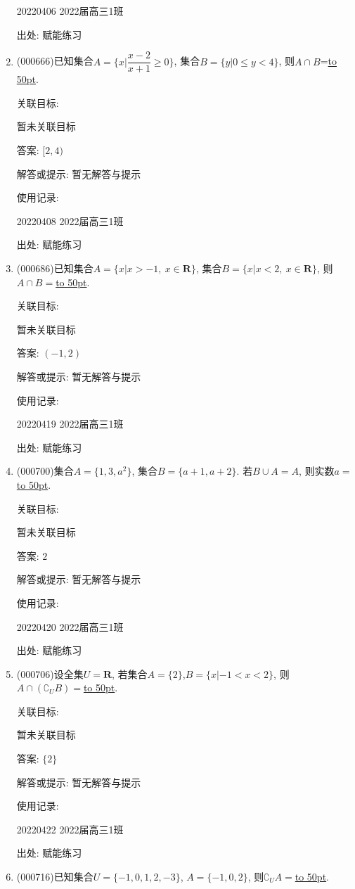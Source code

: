 \documentclass[10pt,a4paper]{article}
\newcommand{\blank}[1]{\underline{\hbox to #1pt{}}}
\begin{document}
\begin{enumerate}[1.]
20220406	2022届高三1班	


出处: 赋能练习
\item { (000666)}已知集合$A=\{x|\dfrac{x-2}{x+1}\ge 0\}$, 集合$B=\{y|0 \le y<4\}$, 则$A\cap B$=\blank{50}.


关联目标:

暂未关联目标

答案: $[2,4)$

解答或提示: 暂无解答与提示

使用记录:

20220408	2022届高三1班	


出处: 赋能练习
\item { (000686)}已知集合$A=\{x|x>-1, \ x\in \mathbf{R}\}$, 集合$B=\{x|x<2, \ x\in \mathbf{R}\}$, 则$A\cap B=$\blank{50}.


关联目标:

暂未关联目标

答案: $(-1,2)$

解答或提示: 暂无解答与提示

使用记录:

20220419	2022届高三1班	


出处: 赋能练习
\item { (000700)}集合$A=\{1,3,a^2\}$, 集合$B=\{a+1,a+2\}$. 若$B\cup A=A$, 则实数$a=$\blank{50}.


关联目标:

暂未关联目标

答案: $2$

解答或提示: 暂无解答与提示

使用记录:

20220420	2022届高三1班	


出处: 赋能练习
\item { (000706)}设全集$U=\mathbf{R}$, 若集合$A=\{2\}$,$B=\{x|-1<x<2\}$, 则$A\cap (\complement_UB)=$\blank{50}.


关联目标:

暂未关联目标

答案: $\{2\}$

解答或提示: 暂无解答与提示

使用记录:

20220422	2022届高三1班	


出处: 赋能练习
\item { (000716)}已知集合$U=\{-1,0,1,2,-3\}$, $A=\{-1,0,2\}$, 则$\complement_U A=$\blank{50}.



\end{enumerate}
\end{document}
